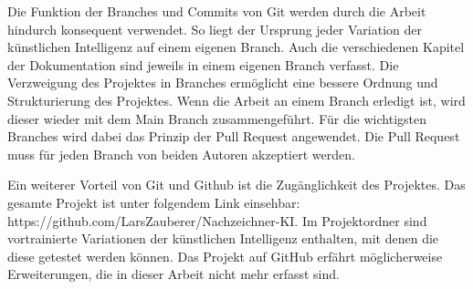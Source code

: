 Die Funktion der Branches und Commits von Git werden durch die Arbeit hindurch
konsequent verwendet. So liegt der Ursprung jeder Variation der künstlichen
Intelligenz auf einem eigenen Branch. Auch die verschiedenen Kapitel der
Dokumentation sind jeweils in einem eigenen Branch verfasst. Die Verzweigung des
Projektes in Branches ermöglicht eine bessere Ordnung und Strukturierung des
Projektes. Wenn die Arbeit an einem Branch erledigt ist, wird dieser wieder mit
dem Main Branch zusammengeführt. Für die wichtigsten Branches wird dabei das
Prinzip der Pull Request angewendet. Die Pull Request muss für jeden Branch von
beiden Autoren akzeptiert werden.

Ein weiterer Vorteil von Git und Github ist die Zugänglichkeit des Projektes.
Das gesamte Projekt ist unter folgendem Link einsehbar:
https://github.com/LarsZauberer/Nachzeichner-KI. Im Projektordner sind
vortrainierte Variationen der künstlichen Intelligenz enthalten, mit denen die
diese getestet werden können. Das Projekt auf GitHub erfährt möglicherweise
Erweiterungen, die in dieser Arbeit nicht mehr erfasst sind.







